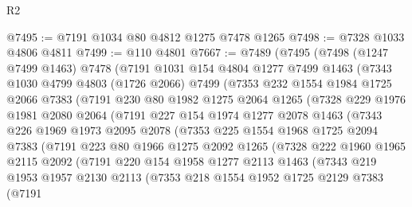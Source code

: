 \begin{lexlean}{R2}
\begin{coremodule}
@7495 := @7191 @1034 @80 @4812 @1275 @7478 @1265
@7498 := @7328 @1033 @4806 @4811
@7499 := @110 @4801
@7667 := @7489
    (@7495
      (@7498
        (@1247 @7499 @1463)
        @7478
        (@7191
          @1031
          @154
          @4804
          @1277
          @7499
          @1463
          (@7343
            @1030
            @4799
            @4803
            (@1726 @2066)
            @7499
            (@7353
              @232
              @1554
              @1984
              @1725
              @2066
              @7383
              (@7191
                @230
                @80
                @1982
                @1275
                @2064
                @1265
                (@7328
                  @229
                  @1976
                  @1981
                  @2080
                  @2064
                  (@7191
                    @227
                    @154
                    @1974
                    @1277
                    @2078
                    @1463
                    (@7343
                      @226
                      @1969
                      @1973
                      @2095
                      @2078
                      (@7353
                        @225
                        @1554
                        @1968
                        @1725
                        @2094
                        @7383
                        (@7191
                          @223
                          @80
                          @1966
                          @1275
                          @2092
                          @1265
                          (@7328
                            @222
                            @1960
                            @1965
                            @2115
                            @2092
                            (@7191
                              @220
                              @154
                              @1958
                              @1277
                              @2113
                              @1463
                              (@7343
                                @219
                                @1953
                                @1957
                                @2130
                                @2113
                                (@7353
                                  @218
                                  @1554
                                  @1952
                                  @1725
                                  @2129
                                  @7383
                                  (@7191

\end{coremodule}
\end{lexlean}
